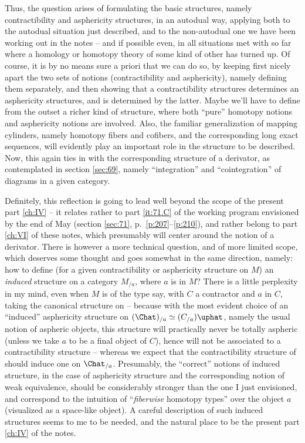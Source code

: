 Thus, the question arises of formulating the basic structures, namely
contractibility and asphericity structures, in an autodual way,
applying both to the autodual situation just described, and to the
non-autodual one we have been working out in the notes -- and if
possible even, in all situations met with so far where a homology or
homotopy theory of some kind of other has turned up. Of course, it is
by no means sure a priori that we can do so, by keeping first nicely
apart the two sets of notions (contractibility and asphericity),
namely defining them separately, and then showing that a
contractibility structures determines an asphericity structures, and
is determined by the latter. Maybe we'll have to define from the
outset a richer kind of structure, where both ``pure'' homotopy
notions and asphericity notions are involved. Also, the familiar
generalization of mapping cylinders, namely homotopy fibers and
cofibers, and the corresponding long exact sequences, will evidently
play an important role in the structure to be described. Now, this
again ties in with the corresponding structure of a derivator, as
contemplated in section \ref{sec:69}, namely ``integration'' and
``cointegration'' of diagrams in a given category.

Definitely, this reflection is going to lead well beyond the scope of
the present part \ref{ch:IV} -- it relates rather to
part \ref{it:71.C} of the working program envisioned by the end of May
(section \ref{sec:71}, p.\ \ref{p:207}--\ref{p:210}), and rather
belong to part \ref{ch:VI} of these notes, which presumably will
center around the notion of a derivator. There is however a more
technical question, and of more limited scope, which deserves some
thought and goes somewhat in the same direction, namely: how to define
(for a given contractibility or asphericity structure on $M$) an
\emph{induced} structure on a category $M_{/a}$, where $a$ is in $M$?
There is a little perplexity in my mind, even when $M$ is of the type
\Chat{} say, with $C$ a contractor and $a$ in $C$, taking the
canonical structure on \Chat{} -- because with the most evident choice
of an ``induced'' asphericity structure on $(\Chat)_{/a} \simeq
(C_{/a})\uphat$, namely the usual notion of aspheric objects, this
structure will practically never be totally aspheric
(unless we take $a$ to be a final object of $C$), hence will not be
associated to a contractibility structure -- whereas we expect that
the contractibility structure of \Chat{} should induce one on
$\Chat_{/a}$. Presumably, the ``correct'' notions of induced
structure, in the case of asphericity structure and the corresponding
notion of weak equivalence, should be considerably stronger than the
one I just envisioned, and correspond to the intuition of
``\emph{fiberwise} homotopy types'' over the object $a$ (visualized as
a space-like object). A careful description of such induced structures
seems to me to be needed, and the natural place to be the present part
\ref{ch:IV} of the notes.

